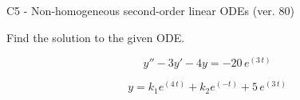 \begin{exercise}
  \begin{exerciseTitle}C5 - Non-homogeneous second-order linear ODEs (ver. 80)\end{exerciseTitle}
  \begin{exerciseStatement}
    
Find the solution to the given ODE.

    
\[y''-3y'-4y = -20 \, e^{\left(3 \, t\right)}\]

  \end{exerciseStatement}
  \begin{exerciseAnswer}
    
\[y= k_{1} e^{\left(4 \, t\right)} + k_{2} e^{\left(-t\right)} + 5 \, e^{\left(3 \, t\right)}\]

  \end{exerciseAnswer}
\end{exercise}